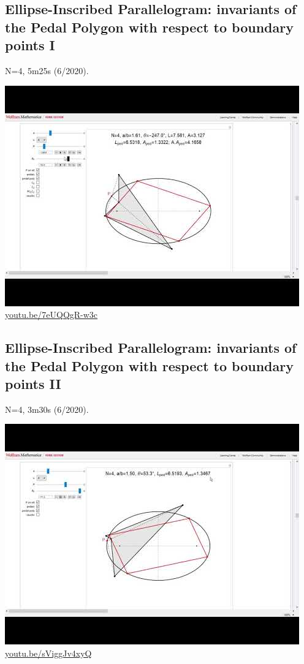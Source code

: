 \documentclass[12pt]{amsart}
\begin{document}
\subsection{Ellipse-Inscribed Parallelogram: invariants of the Pedal Polygon with respect to boundary points I}
\label{vid:7eUQQgR-w3c}
\noindent N=4, 5m25s (6/2020). 
\begin{center}\includegraphics[width=.5\textwidth]{pics/7eUQQgR-w3c.jpg} \\ 
\href{https://youtu.be/7eUQQgR-w3c}{\url{youtu.be/7eUQQgR-w3c}}\end{center}
% 

\subsection{Ellipse-Inscribed Parallelogram: invariants of the Pedal Polygon with respect to boundary points II}
\label{vid:sViggJv4xyQ}
\noindent N=4, 3m30s (6/2020). 
\begin{center}\includegraphics[width=.5\textwidth]{pics/sViggJv4xyQ.jpg} \\ 
\href{https://youtu.be/sViggJv4xyQ}{\url{youtu.be/sViggJv4xyQ}}\end{center}
% 
\end{document}
